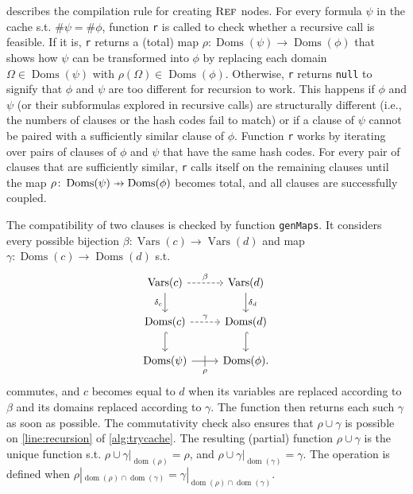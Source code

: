 \documentclass[letterpaper]{article} %
\newcommand\pfun{\mathrel{\ooalign{\hfil$\mapstochar\mkern5mu$\hfil\cr$\to$\cr}}}
\DeclareMathOperator{\Reff}{\textsc{Ref}}
\DeclareMathOperator{\dom}{dom}
\DeclareMathOperator{\Doms}{Doms}
\DeclareMathOperator{\Vars}{Vars}
\theoremstyle{definition}
\begin{document}
 describes the compilation rule for creating $\Reff$ nodes.
For every formula $\psi$ in the cache s.t. $\#\psi = \#\phi$, function
\texttt{r} is called to check whether a recursive call is feasible. If it is,
\texttt{r} returns a (total) map $\rho\colon \Doms(\psi) \to \Doms(\phi)$ that
shows how $\psi$ can be transformed into $\phi$ by replacing each domain
$\Omega \in \Doms(\psi)$ with $\rho(\Omega) \in \Doms(\phi)$. Otherwise,
\texttt{r} returns \texttt{null} to signify that $\phi$ and $\psi$ are too
different for recursion to work. This happens if $\phi$ and $\psi$ (or their
subformulas explored in recursive calls) are structurally different (i.e., the
numbers of clauses or the hash codes fail to match) or if a clause of $\psi$
cannot be paired with a sufficiently similar clause of $\phi$. Function
\texttt{r} works by iterating over pairs of clauses of $\phi$ and $\psi$ that
have the same hash codes. For every pair of clauses that are sufficiently
similar, \texttt{r} calls itself on the remaining clauses until the map
$\rho\colon \Doms(\psi) \pfun \Doms(\phi)$ becomes total, and all clauses are
successfully coupled.

The compatibility of two clauses is checked by function \texttt{genMaps}. It
considers every possible bijection $\beta\colon \Vars(c) \to \Vars(d)$ and map
$\gamma\colon \Doms(c) \to \Doms(d)$ s.t.
\[
  \begin{tikzcd}
    \Vars(c) \ar[r, dashed, "\beta"] \arrow[d, swap, "\delta_c"] & \Vars(d) \ar[d, "\delta_d"] \\
    \Doms(c) \ar[r, dashed, "\gamma"] \ar[d, hookrightarrow] & \Doms(d) \ar[d, hookrightarrow] \\
    \Doms(\psi) \ar[r, swap, "\rho", "|" marking, outer sep=5pt] & \Doms(\phi).
  \end{tikzcd}
\]
commutes, and $c$ becomes equal to $d$ when its variables are replaced according
to $\beta$ and its domains replaced according to $\gamma$. The function then
returns each such $\gamma$ as soon as possible. The commutativity check also
ensures that $\rho \cup \gamma$ is possible on \cref{line:recursion} of
\cref{alg:trycache}. The resulting (partial) function $\rho \cup \gamma$ is the
unique function s.t. $\rho \cup \gamma|_{\dom(\rho)} = \rho$, and
$\rho \cup \gamma|_{\dom(\gamma)} = \gamma$. The operation is defined when
$\rho|_{\dom(\rho)\cap\dom(\gamma)} = \gamma|_{\dom(\rho)\cap\dom(\gamma)}$.
\end{document}
